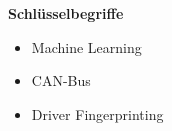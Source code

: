 %
%
% 
% 
% 


{\Large\bfseries Schlüsselbegriffe}
\vspace{0.65cm}

\begin{itemize}
	\setlength{\itemsep}{0pt}
	\item[] Machine Learning
	\item[] CAN-Bus
	\item[] Driver Fingerprinting
\end{itemize}
